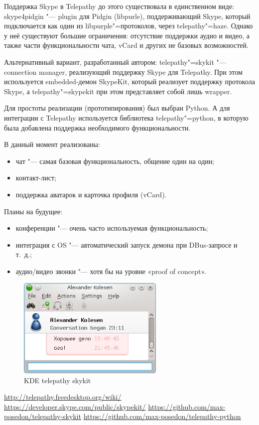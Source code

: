 \documentclass[10pt, a5paper]{article}
\begin{document}
Поддержка Skype в Telepathy до этого существовала в единственном виде: skype4pidgin "--- plugin для Pidgin (libpurle), поддерживающий Skype, который подключается как один из libpurple"=протоколов, через telepathy"=haze. Однако у неё существуют большие ограничения: отсутствие поддержки аудио и видео, а также части функциональности чата, vCard и других не базовых возможностей.

Альтернативный вариант, разработанный автором: telepathy"=sky\-kit "--- connection manager, реализующий поддержку Skype для Telepathy. При этом используется embedded-демон SkypeKit, который реализует поддержку протокола Skype, а telepathy"=skypekit при этом представляет собой лишь wrapper.

Для простоты реализации (прототипирования) был выбран Python. А для интеграции с Telepathy используется библиотека telepathy"=python, в которую была добавлена поддержка необходимого функциональности.

В данный момент реализованы:
\begin{itemize}
\item чат "--- самая базовая функциональность, общение один на один;
\item контакт-лист;
\item поддержка аватарок и карточка профиля (vCard).
\end{itemize}

Планы на будущее:
\begin{itemize}
\item конференции "--- очень часто используемая функциональность;
\item интеграция с OS "--- автоматический запуск демона при DBus-запросе и т.~д.;
\item аудио/видео звонки "--- хотя бы на уровне «proof of concept».
\end{itemize}
\begin{figure}[h]
  \centering
  \includegraphics[width=7cm]{101_2013_w_Melnikau_ktpskype}
  \caption{KDE telepathy skykit}
\end{figure}

\let\saverefname=\refname%
\def\refname{Полезные ссылки}%
\begin{thebibliography}{9}
 \url{http://telepathy.freedesktop.org/wiki/}
 \url{https://developer.skype.com/public/skypekit/}
 \url{https://github.com/max-posedon/telepathy-skykit}
 \url{https://github.com/max-posedon/telepathy-python}
\end{thebibliography}
\let\refname=\saverefname%
\end{document}
